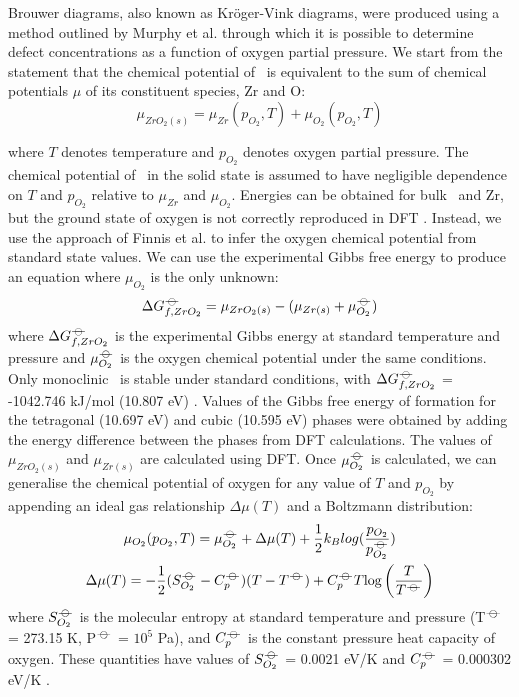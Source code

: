 Brouwer diagrams, also known as Kr{\"o}ger-Vink diagrams, were produced using a method outlined by Murphy et al. \cite{Murphy2014, Murphy2014a} through which it is possible to determine defect concentrations as a function of oxygen partial pressure. We start from the statement that the chemical potential of \zirconia\ is equivalent to the sum of chemical potentials $\mu$ of its constituent species, Zr and O:
\begin{equation}
{\mu}_{ZrO_2(s)} = {\mu}_{Zr}(p_{O_2}, T) + {\mu}_{O_{2}}(p_{O_{2}}, T)
\label{mewZrO2compmethodology}
\end{equation}

where $T$ denotes temperature and $p_{O_2}$ denotes oxygen partial pressure. The chemical potential of \zirconia\ in the solid state is assumed to have negligible dependence on $T$ and $p_{O_2}$ relative to ${\mu}_{Zr}$ and ${\mu}_{O_2}$. Energies can be obtained for bulk \zirconia\ and Zr, but the ground state of oxygen is not correctly reproduced in DFT \cite{Batyrev2000,Lozovoi2001}. Instead, we use the approach of Finnis et al. \cite{Finnis2005} to infer the oxygen chemical potential from standard state values. We can use the experimental Gibbs free energy to produce an equation where $\mu_{O_2}$ is the only unknown:
\begin{equation}
\Delta{G^{{\ensuremath{-\kern-4pt{\ominus}\kern-4pt-}}}_{f, ZrO_2}} = \mu_{ZrO_2(s)} - (\mu_{Zr(s)} + \mu^{{-\kern-4pt{\ominus}\kern-4pt-}}_{O_2})
\end{equation}
where $\Delta{G^{{\ensuremath{-\kern-4pt{\ominus}\kern-4pt-}}}_{f, ZrO_2}}$ is the experimental Gibbs energy at standard temperature and pressure and $\mu^{{-\kern-4pt{\ominus}\kern-4pt-}}_{O_2}$ is the oxygen chemical potential under the same conditions. Only monoclinic \zirconia\ is stable under standard conditions, with $\Delta{G^{{\ensuremath{-\kern-4pt{\ominus}\kern-4pt-}}}_{f, ZrO_2}}$ = -1042.746 kJ/mol (10.807 eV) \cite{brown2005chemical}. Values of the Gibbs free energy of formation for the tetragonal (10.697 eV) and cubic (10.595 eV) phases were obtained by adding the energy difference between the phases from DFT calculations. The values of $\mu_{ZrO_2(s)}$ and $\mu_{Zr(s)}$ are calculated using DFT. Once $\mu^{{-\kern-4pt{\ominus}\kern-4pt-}}_{O_2}$ is calculated, we can generalise the chemical potential of oxygen for any value of $T$ and $p_{O_2}$ by appending an ideal gas relationship $\Delta{\mu(T)}$ and a Boltzmann distribution:
\begin{gather}
\mu_{O_2}(p_{O_2},T) = \mu^{\plimsoll}_{O_2} + \Delta{\mu(T)} + \frac{1}{2}{k_B}log(\frac{p_{O_2}}{p^{\plimsoll}_{O_2}}) \\
\Delta \mu(T) = -\frac{1}{2}(S^{\plimsoll}_{O_{2}}- C^{\plimsoll}_{p})(T-T^{\plimsoll}) + C^{\plimsoll}_{p}T\textup{log}\left ( \frac{T}{T^{\plimsoll}} \right )
\end{gather} 
where $S^{{-\kern-4pt{\ominus}\kern-4pt-}}_{O_{2}}$ is the molecular entropy at standard temperature and pressure (T$^{{-\kern-4pt{\ominus}\kern-4pt-}}$ = 273.15 K, P$^{{-\kern-4pt{\ominus}\kern-4pt-}}$ = $10^{5}$ Pa), and $C^{{-\kern-4pt{\ominus}\kern-4pt-}}_{p}$ is the constant pressure heat capacity of oxygen. These quantities have values of $S^{{-\kern-4pt{\ominus}\kern-4pt-}}_{O_{2}}$ = 0.0021 eV/K and $C^{{-\kern-4pt{\ominus}\kern-4pt-}}_{p}$ = 0.000302 eV/K \cite{weast1984crc}. 

